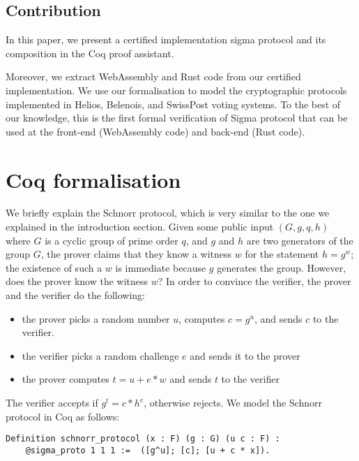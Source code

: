 \documentclass[sigconf]{acmart}
\begin{document}
\subsection{Contribution}
In this paper, we present a certified implementation sigma protocol and its composition 
in the Coq proof assistant.


Moreover, we extract WebAssembly and Rust code from our 
certified implementation. 
We use our formalisation to model the cryptographic protocols implemented in Helios, 
Belenois, and SwissPost voting systems. To the best of our knowledge, this is the first
formal verification of Sigma protocol that can be used at the front-end (WebAssembly code) and
back-end (Rust code). 





\section{Coq formalisation}

  We briefly explain the Schnorr protocol, which is very similar to 
  the one we explained in the introduction section.
  Given some public input $(G, g, q, h)$ where $G$
  is a cyclic group of prime order $q$, and $g$ and $h$ are two 
  generators of the group $G$, the prover claims that they know a
  witness $w$ for the statement $h = g^w$; the existence of such
  a $w$ is immediate because $g$ generates the group. However,
  does the prover know the witness $w$? In order to convince the
  verifier, the prover and the verifier do the following:
  \begin{itemize}
    \item the prover picks a random number $u$, computes $c = g^u$,
    and sends $c$ to the verifier.
    \item the verifier picks a random challenge $e$ and sends it to
    the prover
    \item the prover computes $t = u + e * w$ and sends $t$ to the
    verifier
  \end{itemize}

The verifier accepts if $g^t = c * h^e$, otherwise rejects. 
We model the Schnorr protocol in Coq as follows: 
 
\begin{lstlisting}[language=Coq]
  Definition schnorr_protocol (x : F) (g : G) (u c : F) : 
    @sigma_proto 1 1 1 :=  ([g^u]; [c]; [u + c * x]).
\end{lstlisting}
  
\end{document}
